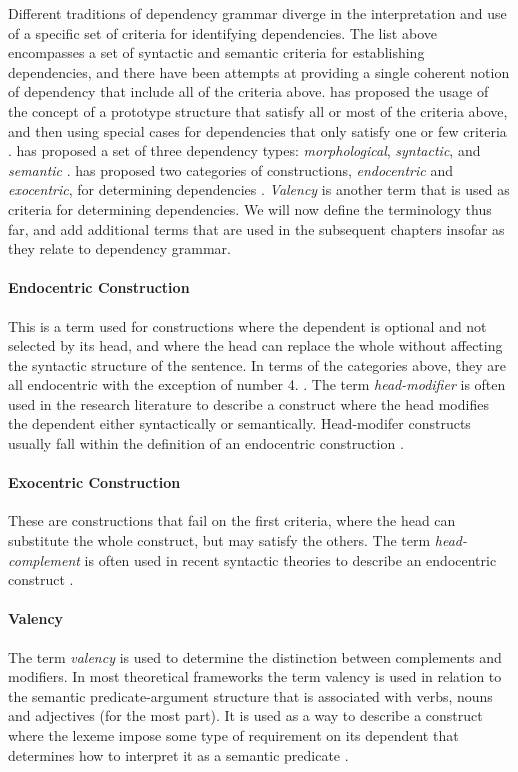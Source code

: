 Different traditions of dependency grammar diverge in the interpretation and use of a specific set of criteria for identifying dependencies. The list above encompasses a set of syntactic and semantic criteria for establishing dependencies, and there have been attempts at providing a single coherent notion of dependency that include all of the criteria above. \citeauthor{Hudson:90} has proposed the usage of the concept of a prototype structure that satisfy all or most of the criteria above, and then using special cases for dependencies that only satisfy one or few criteria \cite{Hudson:90}. \citeauthor{Mel:88} has proposed a set of three dependency types: \textit{morphological}, \textit{syntactic}, and \textit{semantic} \cite{Mel:88}. \citeauthor{Nikula:86} has proposed two categories of constructions, \textit{endocentric} and \textit{exocentric}, for determining dependencies \cite{Nikula:86}. \textit{Valency} is another term that is used as criteria for determining dependencies. We will now define the terminology thus far, and add additional terms that are used in the subsequent chapters insofar as they relate to dependency grammar.

\paragraph{Endocentric Construction} This is a term used for constructions where the dependent is optional and not selected by its head, and where the head can replace the whole without affecting the syntactic structure of the sentence. In terms of the categories above, they are all endocentric with the exception of number 4. \cite{KublerEtAl:09}. The term \textit{head-modifier} is often used in the research literature to describe a construct where the head modifies the dependent either syntactically or semantically. Head-modifer constructs usually fall within the definition of an endocentric construction \cite{Niv:05}.

\paragraph{Exocentric Construction} These are constructions that fail on the first criteria, where the head can substitute the whole construct, but may satisfy the others. The term \textit{head-complement} is often used in recent syntactic theories to describe an endocentric construct \cite{Niv:05}.

\paragraph{Valency} The term \textit{valency} is used to determine the distinction between complements and modifiers. In most theoretical frameworks the term valency is used in relation to the semantic predicate-argument structure that is associated with verbs, nouns and adjectives (for the most part). It is used as a way to describe a construct where the lexeme impose some type of requirement on its dependent that determines how to interpret it as a semantic predicate \cite{Niv:05}.

